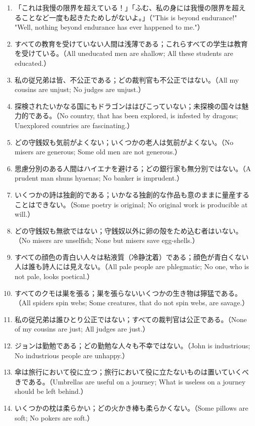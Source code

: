 \documentclass[a4paper,11pt,openany]{ltjsbook}
\begin{document}
\begin{enumerate}[label=\textbf{\arabic*.}]
\item 「これは我慢の限界を超えている！」「ふむ、私の身には我慢の限界を超えることなど一度も起きたためしがないよ。」（"This is beyond endurance!" "Well, nothing beyond endurance has ever happened to me."）
\item すべての教育を受けていない人間は浅薄である；これらすべての学生は教育を受けている。（All uneducated men are shallow; All these students are educated.）
\item 私の従兄弟は皆、不公正である；どの裁判官も不公正ではない。（All my cousins are unjust; No judges are unjust.）
\item 探検されたいかなる国にもドラゴンははびこっていない；未探検の国々は魅力的である。（No country, that has been explored, is infested by dragons; Unexplored countries are fascinating.）
\item どの守銭奴も気前がよくない；いくつかの老人は気前がよくない。（No misers are generous; Some old men are not generous.）
\item 思慮分別のある人間はハイエナを避ける；どの銀行家も無分別ではない。（A prudent man shuns hyaenas; No banker is imprudent.）
\item いくつかの詩は独創的である；いかなる独創的な作品も意のままに量産することはできない。（Some poetry is original; No original work is producible at will.）
\item どの守銭奴も無欲ではない；守銭奴以外に卵の殻をため込む者はいない。（No misers are unselfish; None but misers save egg-shells.）
\item すべての顔色の青白い人々は粘液質（冷静沈着）である；顔色が青白くない人は誰も詩人には見えない。（All pale people are phlegmatic; No one, who is not pale, looks poetical.）
\item すべてのクモは巣を張る；巣を張らないいくつかの生き物は獰猛である。（All spiders spin webs; Some creatures, that do not spin webs, are savage.）
\item 私の従兄弟は誰ひとり公正ではない；すべての裁判官は公正である。（None of my cousins are just; All judges are just.）
\item ジョンは勤勉である；どの勤勉な人々も不幸ではない。（John is industrious; No industrious people are unhappy.）
\item 傘は旅行において役に立つ；旅行において役に立たないものは置いていくべきである。（Umbrellas are useful on a journey; What is useless on a journey should be left behind.）
\item いくつかの枕は柔らかい；どの火かき棒も柔らかくない。（Some pillows are soft; No pokers are soft.）

\end{enumerate}
\end{document}
